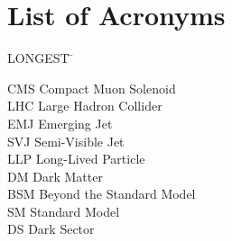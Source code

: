 

\chapter*{List of Acronyms}

\noindent
\vspace{-1.75\baselineskip}
\begin{tabbing}
	LONGEST \=  \kill %

	CMS 	\> Compact Muon Solenoid\\
	LHC 	\> Large Hadron Collider\\
	EMJ 	\> Emerging Jet\\
	SVJ 	\> Semi-Visible Jet\\
	LLP 	\> Long-Lived Particle\\
	DM 		\> Dark Matter\\
	BSM 	\> Beyond the Standard Model\\
	SM 		\> Standard Model\\
	DS 		\> Dark Sector\\

\end{tabbing}
